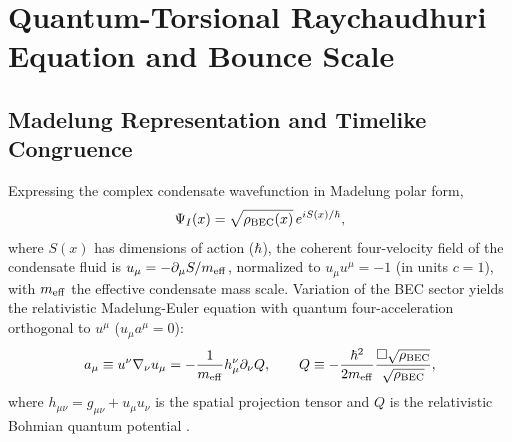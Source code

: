 \documentclass[preprint,12pt]{elsarticle}
\begin{document}
\section{Quantum-Torsional Raychaudhuri Equation and Bounce Scale}
\label{sec:raychaudhuri}

\subsection{Madelung Representation and Timelike Congruence}
Expressing the complex condensate wavefunction in Madelung polar form,
\begin{equation}
    \Psi_I(x) = \sqrt{\rho_{\rm BEC}(x)}\, e^{iS(x)/\hbar},
    \label{eq:madelung}
\end{equation}
where $S(x)$ has dimensions of action ($\hbar$), the coherent four-velocity field of the condensate fluid is $u_\mu = -\partial_\mu S / m_{\rm eff}$, normalized to $u_\mu u^\mu = -1$ (in units $c=1$), with $m_{\rm eff}$ the effective condensate mass scale. Variation of the BEC sector yields the relativistic Madelung-Euler equation with quantum four-acceleration orthogonal to $u^\mu$ ($u_\mu a^\mu = 0$):
\begin{equation}
    a_\mu \equiv u^\nu \nabla_\nu u_\mu = -\frac{1}{m_{\rm eff}} h^\nu_\mu \partial_\nu Q, \qquad
    Q \equiv -\frac{\hbar^2}{2m_{\rm eff}} \frac{\Box \sqrt{\rho_{\rm BEC}}}{\sqrt{\rho_{\rm BEC}}},
    \label{eq:qpot}
\end{equation}
where $h_{\mu\nu} = g_{\mu\nu} + u_\mu u_\nu$ is the spatial projection tensor and $Q$ is the relativistic Bohmian quantum potential \cite{Das2014}.
\end{document}
